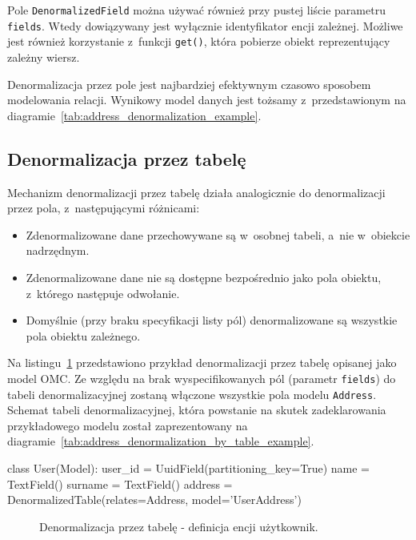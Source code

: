 Pole \verb+DenormalizedField+ można używać również przy pustej liście parametru \verb+fields+. Wtedy dowiązywany jest wyłącznie identyfikator encji zależnej. Możliwe jest również korzystanie z~funkcji \verb+get()+, która pobierze obiekt reprezentujący zależny wiersz.

Denormalizacja przez pole jest najbardziej efektywnym czasowo sposobem modelowania relacji. Wynikowy model danych jest tożsamy z~przedstawionym na diagramie~\ref{tab:address_denormalization_example}.

\subsection{Denormalizacja przez tabelę}

Mechanizm denormalizacji przez tabelę działa analogicznie do denormalizacji przez pola, z~następującymi różnicami:

\begin{itemize}
	\item Zdenormalizowane dane przechowywane są w~osobnej tabeli, a~nie w~obiekcie nadrzędnym. 
	\item Zdenormalizowane dane nie są dostępne bezpośrednio jako pola obiektu, z~którego następuje odwołanie. 
	\item Domyślnie (przy braku specyfikacji listy pól) denormalizowane są wszystkie pola obiektu zależnego.
\end{itemize}

Na listingu~\ref{lst:denormalization_by_table_example} przedstawiono przykład denormalizacji przez tabelę opisanej jako model OMC. Ze względu na brak wyspecifikowanych pól (parametr \verb+fields+) do tabeli denormalizacyjnej zostaną włączone wszystkie pola modelu \verb+Address+. Schemat tabeli denormalizacyjnej, która powstanie na skutek zadeklarowania przykładowego modelu został zaprezentowany na diagramie~\ref{tab:address_denormalization_by_table_example}.

\begin{verbbox}
class User(Model):
    user_id = UuidField(partitioning_key=True)
    name = TextField()
    surname = TextField()
    address = DenormalizedTable(relates=Address, model='UserAddress')
\end{verbbox}

\begin{figure}[ht!]
	\centering
	\theverbbox
	\caption{Denormalizacja przez tabelę - definicja encji użytkownik.}
	\label{lst:denormalization_by_table_example}
\end{figure}

